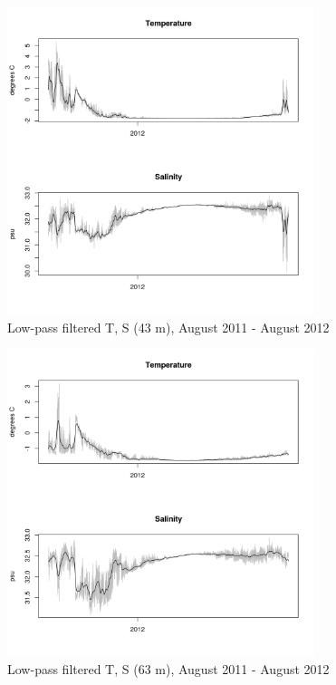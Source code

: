 \documentclass[12pt]{dforeport}
\begin{document}
\begin{figure}  
\centering
\includegraphics[width = 0.8\textwidth]{./figures/19_lpf_TS_43m_2011_2012.png}
\caption[Low-pass filtered T, S (43 m), 2011-2012]{Low-pass filtered T, S (43 m), August 2011 - August 2012}
\label{f:ctd_43_lpf_2011_2012}
\end{figure}

\begin{figure}  
\centering
\includegraphics[width = 0.8\textwidth]{./figures/20_lpf_TS_63m_2011_2012.png}
\caption[Low-pass filtered T, S (63 m), 2011-2012]{Low-pass filtered T, S (63 m), August 2011 - August 2012}
\label{f:ctd_63_lpf_2011_2012}
\end{figure}
\end{document}
